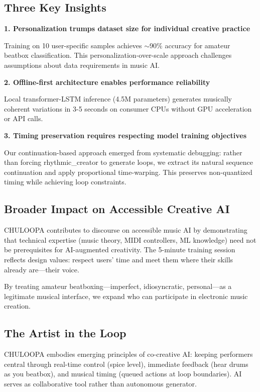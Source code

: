 \documentclass{aimc2026}
\begin{document}
\subsection{Three Key Insights}

\textbf{1. Personalization trumps dataset size for individual creative practice}

Training on 10 user-specific samples achieves $\sim$90\% accuracy for amateur beatbox classification. This personalization-over-scale approach challenges assumptions about data requirements in music AI.

\textbf{2. Offline-first architecture enables performance reliability}

Local transformer-LSTM inference (4.5M parameters) generates musically coherent variations in 3-5 seconds on consumer CPUs without GPU acceleration or API calls.

\textbf{3. Timing preservation requires respecting model training objectives}

Our continuation-based approach emerged from systematic debugging: rather than forcing rhythmic\_creator to generate loops, we extract its natural sequence continuation and apply proportional time-warping. This preserves non-quantized timing while achieving loop constraints.

\subsection{Broader Impact on Accessible Creative AI}

CHULOOPA contributes to discourse on accessible music AI by demonstrating that technical expertise (music theory, MIDI controllers, ML knowledge) need not be prerequisites for AI-augmented creativity. The 5-minute training session reflects design values: respect users' time and meet them where their skills already are---their voice.

By treating amateur beatboxing---imperfect, idiosyncratic, personal---as a legitimate musical interface, we expand who can participate in electronic music creation.

\subsection{The Artist in the Loop}

CHULOOPA embodies emerging principles of co-creative AI: keeping performers central through real-time control (spice level), immediate feedback (hear drums as you beatbox), and musical timing (queued actions at loop boundaries). AI serves as collaborative tool rather than autonomous generator.
\end{document}
